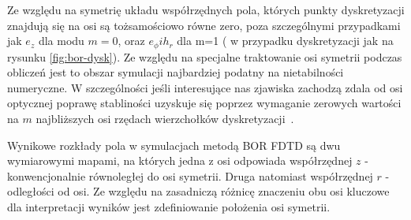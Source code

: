 Ze względu na symetrię układu współrzędnych pola, których punkty dyskretyzacji znajdują się na osi są tożsamościowo równe zero, poza szczególnymi przypadkami jak $e_z$ dla modu $m=0$, oraz $e_{\phi} i h_r$ dla m=1 ( w przypadku dyskretyzacji jak na rysunku \ref{fig:bor-dysk}). Ze względu na specjalne traktowanie osi symetrii podczas obliczeń jest to obszar symulacji najbardziej podatny na nietabilności numeryczne. W szczególności jeśli interesujące nas zjawiska zachodzą zdala od osi optycznej poprawę stabliności uzyskuje się poprzez wymaganie zerowych wartości na $m$ najbliższych osi rzędach wierzchołków dyskretyzacji~\cite{OskooiRo10}.

Wynikowe rozkłady pola w symulacjach metodą BOR FDTD są dwu wymiarowymi mapami, na których jedna z osi odpowiada współrzędnej $z$ - konwencjonalnie równoległej do osi symetrii. Druga natomiast współrzędnej $r$ - odległości od osi. Ze względu na zasadniczą różnicę znaczeniu obu osi kluczowe dla interpretacji wyników jest zdefiniowanie położenia osi symetrii.


